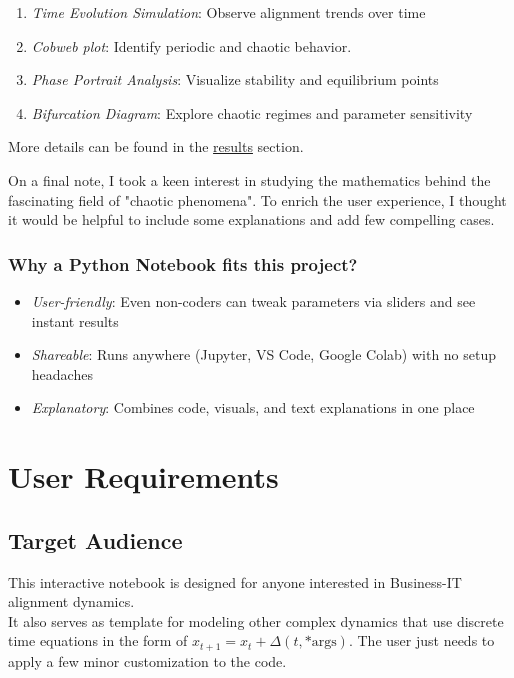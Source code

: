 \documentclass[a4paper, 10pt]{article}
\begin{document}
\begin{enumerate}
    \item \textit{Time Evolution Simulation}: Observe alignment trends over time
    \item \textit{Cobweb plot}: Identify periodic and chaotic behavior.
    \item \textit{Phase Portrait Analysis}: Visualize stability and equilibrium points
    \item \textit{Bifurcation Diagram}: Explore chaotic regimes and parameter sensitivity
\end{enumerate}

More details can be found in the \hyperref[sec:results]{results} section.

On a final note, I took a keen interest in studying the mathematics behind the fascinating field of "chaotic phenomena". 
To enrich the user experience, I thought it would be helpful to include some explanations and add few compelling cases.

\subsubsection*{Why a Python Notebook fits this project?}

\begin{itemize}
    \item \textit{User-friendly}: Even non-coders can tweak parameters via sliders and see instant results
    \item \textit{Shareable}: Runs anywhere (Jupyter, VS Code, Google Colab) with no setup headaches
    \item \textit{Explanatory}: Combines code, visuals, and text explanations in one place
\end{itemize}

\section{User Requirements}
\subsection{Target Audience}
This interactive notebook is designed for anyone interested in Business-IT alignment dynamics. \\
It also serves as template for modeling other complex dynamics that use discrete time equations in the form of $x_{t+1} = x_t + \Delta(t, \text{*args})$. The user just needs to apply a few minor customization to the code.
\end{document}

